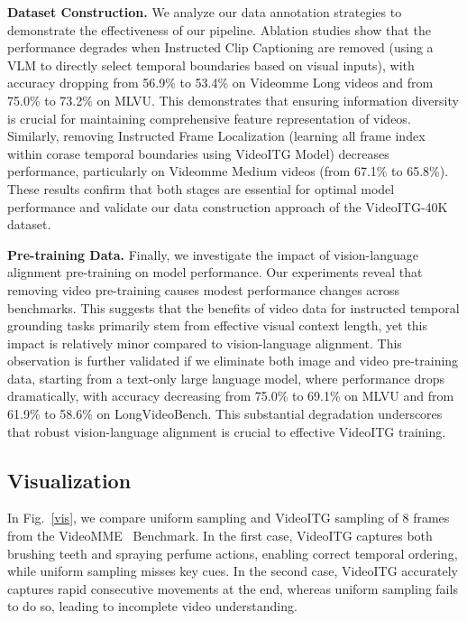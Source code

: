 \noindent\textbf{Dataset Construction.} We analyze our data annotation strategies to demonstrate the effectiveness of our pipeline. Ablation studies show that the performance degrades when Instructed Clip Captioning are removed (using a VLM to directly select temporal boundaries based on visual inputs), with accuracy dropping from 56.9\% to 53.4\% on Videomme Long videos and from 75.0\% to 73.2\% on MLVU. This demonstrates that ensuring information diversity is crucial for maintaining comprehensive feature  representation of videos. Similarly, removing Instructed Frame Localization (learning all frame index within corase temporal boundaries using VideoITG Model) decreases performance, particularly on Videomme Medium videos (from 67.1\% to 65.8\%). These results confirm that both stages are essential for optimal model performance and validate our data construction approach of the VideoITG-40K dataset.

\noindent\textbf{Pre-training Data.} Finally, we investigate the impact of vision-language alignment pre-training on model performance. Our experiments reveal that removing video pre-training causes modest performance changes across benchmarks. This suggests that the benefits of video data for instructed temporal grounding tasks primarily stem from effective visual context length, yet this impact is relatively minor compared to vision-language alignment. This observation is further validated if we eliminate both image and video pre-training data, starting from a text-only large language model, where performance drops dramatically, with accuracy decreasing from 75.0\% to 69.1\% on MLVU and from 61.9\% to 58.6\% on LongVideoBench. This substantial degradation underscores that robust vision-language alignment is crucial to effective VideoITG training.%




\subsection{Visualization}
In Fig.~\ref{vis}, we compare uniform sampling and VideoITG sampling of 8 frames from the VideoMME~\cite{fu2024videomme} Benchmark. In the first case, VideoITG captures both brushing teeth and spraying perfume actions, enabling correct temporal ordering, while uniform sampling misses key cues. In the second case, VideoITG accurately captures rapid consecutive movements at the end, whereas uniform sampling fails to do so, leading to incomplete video understanding.


